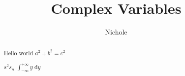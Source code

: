 \documentclass[]{report}
\title{Complex Variables}
\author{Nichole}
\begin{document}
\maketitle

\begin{abstract}
    Hello world $a^2+b^2=c^2$

    $s^2 s_n$
    \begin{math}
    \int_{-\infty}^{+\infty}{y\; \mathrm{d} y}
    \end{math}
\end{abstract}
\end{document}
